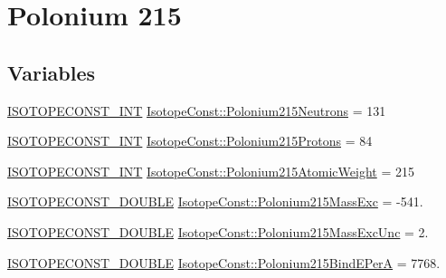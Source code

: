 \hypertarget{group___isotope_const-_polonium-_po215}{}\section{Polonium 215}
\label{group___isotope_const-_polonium-_po215}
\subsection*{Variables}
\begin{DoxyCompactItemize}
\item 
\mbox{\hyperlink{group___isotope_const-_macros_ga5f18360b3e99483a35c32d789e62621c}{I\+S\+O\+T\+O\+P\+E\+C\+O\+N\+S\+T\+\_\+\+I\+NT}} \mbox{\hyperlink{group___isotope_const-_polonium-_po215_ga400a464083b4eb36b0cd54076ccd2268}{Isotope\+Const\+::\+Polonium215\+Neutrons}} = 131
\item 
\mbox{\hyperlink{group___isotope_const-_macros_ga5f18360b3e99483a35c32d789e62621c}{I\+S\+O\+T\+O\+P\+E\+C\+O\+N\+S\+T\+\_\+\+I\+NT}} \mbox{\hyperlink{group___isotope_const-_polonium-_po215_gae072a899fc950fad2b5a6559ac6ef7f8}{Isotope\+Const\+::\+Polonium215\+Protons}} = 84
\item 
\mbox{\hyperlink{group___isotope_const-_macros_ga5f18360b3e99483a35c32d789e62621c}{I\+S\+O\+T\+O\+P\+E\+C\+O\+N\+S\+T\+\_\+\+I\+NT}} \mbox{\hyperlink{group___isotope_const-_polonium-_po215_gab13fdb68c636bf7a1716be4510303e7b}{Isotope\+Const\+::\+Polonium215\+Atomic\+Weight}} = 215
\item 
\mbox{\hyperlink{group___isotope_const-_macros_ga8f45a7272ce02c0b4c65c44636ed719a}{I\+S\+O\+T\+O\+P\+E\+C\+O\+N\+S\+T\+\_\+\+D\+O\+U\+B\+LE}} \mbox{\hyperlink{group___isotope_const-_polonium-_po215_gaed091a2354e353f1c783616b880255a2}{Isotope\+Const\+::\+Polonium215\+Mass\+Exc}} = -\/541.
\item 
\mbox{\hyperlink{group___isotope_const-_macros_ga8f45a7272ce02c0b4c65c44636ed719a}{I\+S\+O\+T\+O\+P\+E\+C\+O\+N\+S\+T\+\_\+\+D\+O\+U\+B\+LE}} \mbox{\hyperlink{group___isotope_const-_polonium-_po215_gad66c4a731720a557ffd7d520d99a7b70}{Isotope\+Const\+::\+Polonium215\+Mass\+Exc\+Unc}} = 2.
\item 
\mbox{\hyperlink{group___isotope_const-_macros_ga8f45a7272ce02c0b4c65c44636ed719a}{I\+S\+O\+T\+O\+P\+E\+C\+O\+N\+S\+T\+\_\+\+D\+O\+U\+B\+LE}} \mbox{\hyperlink{group___isotope_const-_polonium-_po215_ga6beaade921dc7ac4827808a7bf1ddae8}{Isotope\+Const\+::\+Polonium215\+Bind\+E\+PerA}} = 7768.
\item 

\end{DoxyCompactItemize}
